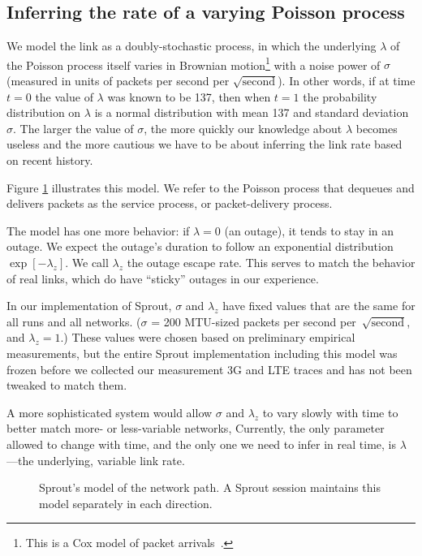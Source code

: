 \subsection{Inferring the rate of a varying Poisson process}

We model the link as a doubly-stochastic process, in which the
underlying $\lambda$ of the Poisson process itself varies in Brownian
motion\footnote{This is a Cox model of packet
  arrivals~\cite{Cox84,Paxson95}.} with a noise power of $\sigma$
(measured in units of packets per second per
$\sqrt{\mbox{second}}$). In other words, if at time $t = 0$ the value
of $\lambda$ was known to be 137, then when $t = 1$ the probability
distribution on $\lambda$ is a normal distribution with mean 137 and
standard deviation $\sigma$.  The larger the value of $\sigma$, the
more quickly our knowledge about $\lambda$ becomes useless and the
more cautious we have to be about inferring the link rate based on
recent history.

Figure \ref{f:sprout-model} illustrates this model. We refer to the
Poisson process that dequeues and delivers packets as the service
process, or packet-delivery process.

The model has one more behavior: if $\lambda = 0$ (an outage), it
tends to stay in an outage. We expect the outage's duration to follow
an exponential distribution $\exp\left[-\lambda_z\right]$. We call
$\lambda_z$ the outage escape rate. This serves to match the behavior
of real links, which do have ``sticky'' outages in our experience.

In our implementation of Sprout, $\sigma$ and $\lambda_z$ have fixed
values that are the same for all runs and all networks. ($\sigma$ =
200 MTU-sized packets per second per~$\sqrt{\mbox{second}}$, and $\lambda_z =
1$.) These values were chosen based on preliminary empirical
measurements, but the entire Sprout implementation including this
model was frozen before we collected our measurement 3G and LTE traces
and has not been tweaked to match them.

A more sophisticated system would allow $\sigma$ and $\lambda_z$ to
vary slowly with time to better match more- or less-variable networks,
Currently, the only parameter allowed to change with time, and the
only one we need to infer in real time, is $\lambda$---the underlying,
variable link rate.

\begin{figure}
  \caption{Sprout's model of the network path. A Sprout session
    maintains this model separately in each direction.}

\hspace{\baselineskip}

\noindent \def\svgwidth{\columnwidth}\large

\label{f:sprout-model}

\end{figure}


